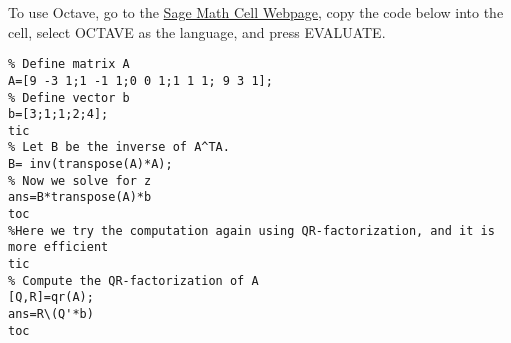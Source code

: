 \documentclass{ximera}
\begin{document}

To use Octave, go to the \href{https://sagecell.sagemath.org/}{Sage Math Cell Webpage}, copy the code below into the cell, select OCTAVE as the language, and press EVALUATE.

\begin{verbatim}
% Define matrix A
A=[9 -3 1;1 -1 1;0 0 1;1 1 1; 9 3 1];
% Define vector b
b=[3;1;1;2;4];
tic
% Let B be the inverse of A^TA.  
B= inv(transpose(A)*A);
% Now we solve for z
ans=B*transpose(A)*b
toc
%Here we try the computation again using QR-factorization, and it is more efficient
tic
% Compute the QR-factorization of A  
[Q,R]=qr(A);
ans=R\(Q'*b)
toc
\end{verbatim}

\end{document}
